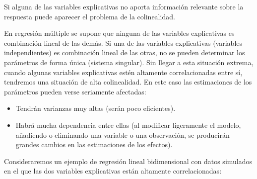 \documentclass[
]{book}
\theoremstyle{break}
\theoremstyle{definition}
\theoremstyle{definition}
\theoremstyle{definition}
\theoremstyle{definition}
\theoremstyle{remark}
\begin{document}
Si alguna de las variables explicativas no aporta información relevante sobre la respuesta puede aparecer el problema de la colinealidad.

En regresión múltiple se supone que ninguna de las variables explicativas es combinación lineal de las demás.
Si una de las variables explicativas (variables independientes) es combinación lineal de las otras, no se pueden determinar los parámetros de forma única (sistema singular).
Sin llegar a esta situación extrema, cuando algunas variables explicativas estén altamente correlacionadas entre sí, tendremos una situación de alta colinealidad.
En este caso las estimaciones de los parámetros pueden verse seriamente afectadas:

\begin{itemize}
\item
  Tendrán varianzas muy altas (serán poco eficientes).
\item
  Habrá mucha dependencia entre ellas (al modificar ligeramente el
  modelo, añadiendo o eliminando una variable o una observación,
  se producirán grandes cambios en las estimaciones de los efectos).
\end{itemize}

Consideraremos un ejemplo de regresión lineal bidimensional con datos simulados en el que las dos variables explicativas están altamente correlacionadas:
\end{document}
